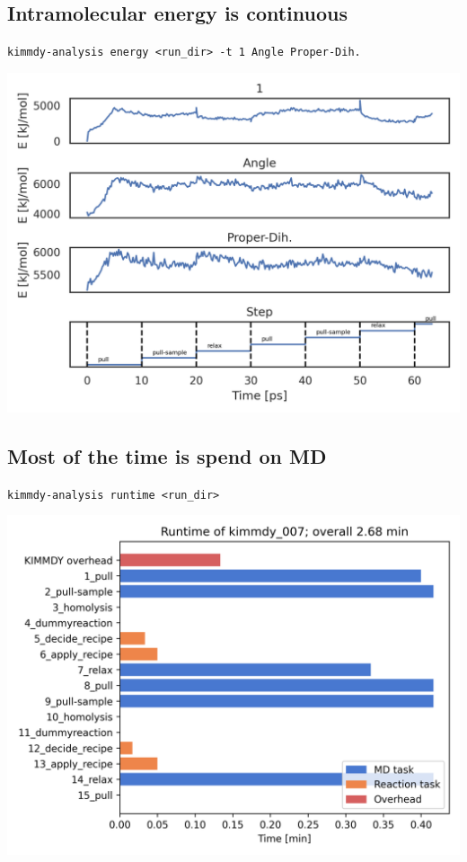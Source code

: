 \documentclass[
  letterpaper,
  DIV=11,
  numbers=noendperiod]{scrartcl}
\begin{document}
\hypertarget{intramolecular-energy-is-continuous}{%
\subsection{Intramolecular energy is
continuous}\label{intramolecular-energy-is-continuous}}

\texttt{kimmdy-analysis\ energy\ \textless{}run\_dir\textgreater{}\ -t\ 1\ Angle\ Proper-Dih.}

\includegraphics{www/tripelhelix_bonded.png}

\hypertarget{most-of-the-time-is-spend-on-md}{%
\subsection{Most of the time is spend on
MD}\label{most-of-the-time-is-spend-on-md}}

\texttt{kimmdy-analysis\ runtime\ \textless{}run\_dir\textgreater{}}

\includegraphics{www/tripelhelix_runtime.png}
\end{document}
